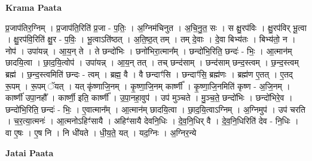 \documentclass[17pt]{extarticle}
\begin{document}
\textbf{Krama Paata} \newline

प्र॒जाप॑तिर॒ग्निम् । प्र॒जाप॑ति॒रिति॑ प्र॒जा - प॒तिः॒ । अ॒ग्निम॑चिनुत । अ॒चि॒नु॒त॒ सः । स क्षु॒रप॑विः । क्षु॒रप॑विर् भू॒त्वा । क्षु॒रप॑वि॒रिति॑ क्षु॒र - प॒विः॒ । भू॒त्वाऽति॑ष्ठत् । अ॒ति॒ष्ठ॒त् तम् । तम् दे॒वाः । दे॒वा बिभ्य॑तः । बिभ्य॑तो॒ न । नोप॑ । उपा॑यन्न् । आ॒य॒न् ते । ते छन्दो॑भिः । छनो॑भिरा॒त्मान᳚म् । छन्दो॑भि॒रिति॒ छन्दः॑ - भिः॒ । आ॒त्मान॑म् छादयि॒त्वा । छा॒द॒यि॒त्वोप॑ । उपा॑यन्न् । आ॒य॒न् तत् । तच् छन्द॑साम् । छन्द॑साम् छन्द॒स्त्वम् । छ॒न्द॒स्त्वम् ब्रह्म॑ । छ॒न्द॒स्त्वमिति॑ छन्दः - त्वम् । ब्रह्म॒ वै । वै छन्दाꣳ॑सि । छन्दाꣳ॑सि॒ ब्रह्म॑णः । ब्रह्म॑ण ए॒तत् । ए॒तद् रू॒पम् । रू॒पम् ॅयत् । यत् कृ॑ष्णाजि॒नम् । कृ॒ष्णा॒जि॒नम् कार्ष्णी᳚ । कृ॒ष्णा॒जि॒नमिति॑ कृष्ण - अ॒जि॒नम् । कार्ष्णी॑ उपा॒नहौ᳚ । कार्ष्णी॒ इति॒ कार्ष्णी᳚ । उ॒पा॒नहा॒वुप॑ । उप॑ मुञ्चते । मु॒ञ्च॒ते॒ छन्दो॑भिः । छन्दो॑भिरे॒व । छन्दो॑भि॒रिति॒ छन्दः॑ - भिः॒ । ए॒वात्मान᳚म् । आ॒त्मान॑म् छादयि॒त्वा । छा॒द॒यि॒त्वाऽग्निम् । अ॒ग्निमुप॑ । उप॑ चरति । च॒र॒त्या॒त्मनः॑ । आ॒त्मनोऽहिꣳ॑सायै । अहिꣳ॑सायै देवनि॒धिः । दे॒व॒नि॒धिर् वै । दे॒व॒नि॒धिरिति॑ देव - नि॒धिः । वा ए॒षः । ए॒ष नि । नि धी॑यते । धी॒य॒ते॒ यत् । यद॒ग्निः । अ॒ग्निर॒न्ये \newline

\textbf{Jatai Paata} \newline
\end{document}
